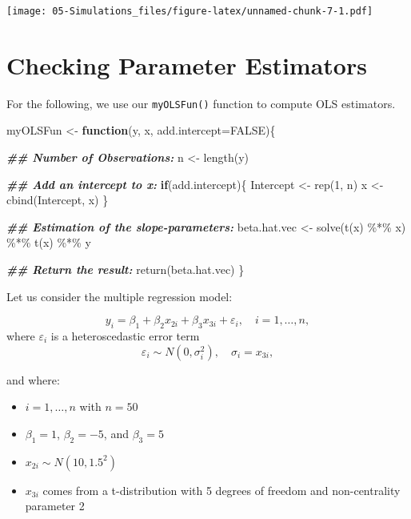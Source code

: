 \documentclass[
]{book}
\newenvironment{Shaded}{\begin{snugshade}}{\end{snugshade}}
\newcommand{\AttributeTok}[1]{\textcolor[rgb]{0.77,0.63,0.00}{#1}}
\newcommand{\ConstantTok}[1]{\textcolor[rgb]{0.00,0.00,0.00}{#1}}
\newcommand{\ControlFlowTok}[1]{\textcolor[rgb]{0.13,0.29,0.53}{\textbf{#1}}}
\newcommand{\DecValTok}[1]{\textcolor[rgb]{0.00,0.00,0.81}{#1}}
\newcommand{\DocumentationTok}[1]{\textcolor[rgb]{0.56,0.35,0.01}{\textbf{\textit{#1}}}}
\newcommand{\FunctionTok}[1]{\textcolor[rgb]{0.00,0.00,0.00}{#1}}
\newcommand{\NormalTok}[1]{#1}
\newcommand{\OtherTok}[1]{\textcolor[rgb]{0.56,0.35,0.01}{#1}}
\newcommand{\SpecialCharTok}[1]{\textcolor[rgb]{0.00,0.00,0.00}{#1}}
\providecommand{\tightlist}{%
  \setlength{\itemsep}{0pt}\setlength{\parskip}{0pt}}
\begin{document}
\texttt{[image: 05-Simulations\_files/figure-latex/unnamed-chunk-7-1.pdf]}

\hypertarget{checking-parameter-estimators}{%
\section{Checking Parameter Estimators}\label{checking-parameter-estimators}}

For the following, we use our \texttt{myOLSFun()} function to compute OLS estimators.

\begin{Shaded}
\begin{Highlighting}[]
\NormalTok{myOLSFun }\OtherTok{\textless{}{-}} \ControlFlowTok{function}\NormalTok{(y, x, }\AttributeTok{add.intercept=}\ConstantTok{FALSE}\NormalTok{)\{}
  
  \DocumentationTok{\#\# Number of Observations:}
\NormalTok{  n         }\OtherTok{\textless{}{-}} \FunctionTok{length}\NormalTok{(y)}
  
  \DocumentationTok{\#\# Add an intercept to x:}
  \ControlFlowTok{if}\NormalTok{(add.intercept)\{}
\NormalTok{    Intercept }\OtherTok{\textless{}{-}} \FunctionTok{rep}\NormalTok{(}\DecValTok{1}\NormalTok{, n)}
\NormalTok{    x         }\OtherTok{\textless{}{-}} \FunctionTok{cbind}\NormalTok{(Intercept, x)}
\NormalTok{  \}}
  
  \DocumentationTok{\#\# Estimation of the slope{-}parameters:}
\NormalTok{  beta.hat.vec }\OtherTok{\textless{}{-}} \FunctionTok{solve}\NormalTok{(}\FunctionTok{t}\NormalTok{(x) }\SpecialCharTok{\%*\%}\NormalTok{ x) }\SpecialCharTok{\%*\%} \FunctionTok{t}\NormalTok{(x) }\SpecialCharTok{\%*\%}\NormalTok{ y}
  
  \DocumentationTok{\#\# Return the result:}
  \FunctionTok{return}\NormalTok{(beta.hat.vec)}
\NormalTok{\}}
\end{Highlighting}
\end{Shaded}

Let us consider the multiple regression model:

\[y_i=\beta_1 +\beta_2 x_{2i}+\beta_3 x_{3i}+\varepsilon_{i},\quad i=1,\dots,n,\]
where \(\varepsilon_{i}\) is a heteroscedastic error term
\[\varepsilon_{i}\sim N(0,\sigma_i^2),\quad \sigma_i=x_{3i},\]

and where:

\begin{itemize}
\tightlist
\item
  \(i=1,\dots,n\) with \(n=50\)
\item
  \(\beta_1=1\), \(\beta_2=-5\), and \(\beta_3=5\)
\item
  \(x_{2i}\sim N(10,1.5^2)\)
\item
  \(x_{3i}\) comes from a t-distribution with 5 degrees of freedom and non-centrality parameter 2
\end{itemize}
\end{document}

